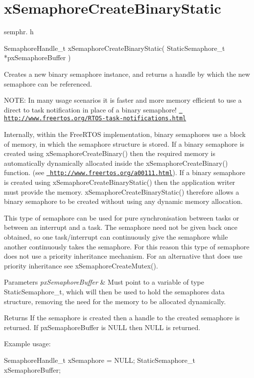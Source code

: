 \hypertarget{group__x_semaphore_create_binary_static}{}\section{x\+Semaphore\+Create\+Binary\+Static}
\label{group__x_semaphore_create_binary_static}
semphr. h 
\begin{DoxyPre}SemaphoreHandle\_t xSemaphoreCreateBinaryStatic( StaticSemaphore\_t *pxSemaphoreBuffer )\end{DoxyPre}


Creates a new binary semaphore instance, and returns a handle by which the new semaphore can be referenced.

N\+O\+TE\+: In many usage scenarios it is faster and more memory efficient to use a direct to task notification in place of a binary semaphore! \href{http://www.freertos.org/RTOS-task-notifications.html}{\texttt{ http\+://www.\+freertos.\+org/\+R\+T\+O\+S-\/task-\/notifications.\+html}}

Internally, within the Free\+R\+T\+OS implementation, binary semaphores use a block of memory, in which the semaphore structure is stored. If a binary semaphore is created using x\+Semaphore\+Create\+Binary() then the required memory is automatically dynamically allocated inside the x\+Semaphore\+Create\+Binary() function. (see \href{http://www.freertos.org/a00111.html}{\texttt{ http\+://www.\+freertos.\+org/a00111.\+html}}). If a binary semaphore is created using x\+Semaphore\+Create\+Binary\+Static() then the application writer must provide the memory. x\+Semaphore\+Create\+Binary\+Static() therefore allows a binary semaphore to be created without using any dynamic memory allocation.

This type of semaphore can be used for pure synchronisation between tasks or between an interrupt and a task. The semaphore need not be given back once obtained, so one task/interrupt can continuously \textquotesingle{}give\textquotesingle{} the semaphore while another continuously \textquotesingle{}takes\textquotesingle{} the semaphore. For this reason this type of semaphore does not use a priority inheritance mechanism. For an alternative that does use priority inheritance see x\+Semaphore\+Create\+Mutex().


\begin{DoxyParams}{Parameters}
{\em px\+Semaphore\+Buffer} & Must point to a variable of type Static\+Semaphore\+\_\+t, which will then be used to hold the semaphore\textquotesingle{}s data structure, removing the need for the memory to be allocated dynamically.\\
\hline
\end{DoxyParams}
\begin{DoxyReturn}{Returns}
If the semaphore is created then a handle to the created semaphore is returned. If px\+Semaphore\+Buffer is N\+U\+LL then N\+U\+LL is returned.
\end{DoxyReturn}
Example usage\+: 
\begin{DoxyPre}
SemaphoreHandle\_t xSemaphore = NULL;
StaticSemaphore\_t xSemaphoreBuffer;\end{DoxyPre}



